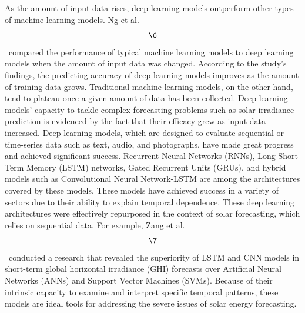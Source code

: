 \documentclass[a4paper,fleqn]{cas-sc}
\begin{document}
As the amount of input data rises, deep learning models outperform other types of machine learning models. Ng et al. \[\6\]\ compared the performance of typical machine learning models to deep learning models when the amount of input data was changed. According to the study's findings, the predicting accuracy of deep learning models improves as the amount of training data grows. Traditional machine learning models, on the other hand, tend to plateau once a given amount of data has been collected. Deep learning models' capacity to tackle complex forecasting problems such as solar irradiance prediction is evidenced by the fact that their efficacy grew as input data increased. Deep learning models, which are designed to evaluate sequential or time-series data such as text, audio, and photographs, have made great progress and achieved significant success. Recurrent Neural Networks (RNNs), Long Short-Term Memory (LSTM) networks, Gated Recurrent Units (GRUs), and hybrid models such as Convolutional Neural Network-LSTM are among the architectures covered by these models. These models have achieved success in a variety of sectors due to their ability to explain temporal dependence.
These deep learning architectures were effectively repurposed in the context of solar forecasting, which relies on sequential data. For example, Zang et al. \[\7\]\ conducted a research that revealed the superiority of LSTM and CNN models in short-term global horizontal irradiance (GHI) forecasts over Artificial Neural Networks (ANNs) and Support Vector Machines (SVMs). Because of their intrinsic capacity to examine and interpret specific temporal patterns, these models are ideal tools for addressing the severe issues of solar energy forecasting.
\end{document}
